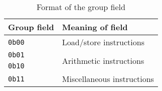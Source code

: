 \begin{table}[h]
    \centering
    \begin{tabular}{|l l|}
        \hline
        \textbf{Group field} & \textbf{Meaning of field} \\
        \hline
        \texttt{0b00} & Load/store instructions \\
        \hline
        \texttt{0b01} & \multirow{2}{*}{Arithmetic instructions} \\
        \texttt{0b10} & \\
        \hline
        \texttt{0b11} & Miscellaneous instructions \\
        \hline
    \end{tabular}
    
    \caption{Format of the group field}
    \label{tab:group_fmt}
\end{table}
